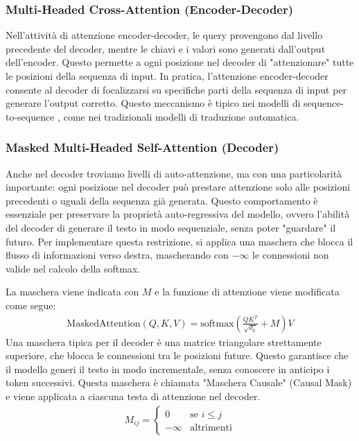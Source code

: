 \subsubsection{Multi-Headed Cross-Attention (Encoder-Decoder)}
Nell'attività di attenzione encoder-decoder, le query provengono dal livello precedente del decoder, mentre le chiavi e i valori sono generati dall'output dell'encoder. Questo permette a ogni posizione nel decoder di "attenzionare" tutte le posizioni della sequenza di input. In pratica, l'attenzione encoder-decoder consente al decoder di focalizzarsi su specifiche parti della sequenza di input per generare l'output corretto. Questo meccanismo è tipico nei modelli di sequence-to-sequence \cite{sutskever2014sequencesequencelearningneural}, come nei tradizionali modelli di traduzione automatica.

\subsubsection{Masked Multi-Headed Self-Attention (Decoder)}
\label{sec:masked-multi-head-attention}
Anche nel decoder troviamo livelli di auto-attenzione, ma con una particolarità importante: ogni posizione nel decoder può prestare attenzione solo alle posizioni precedenti o uguali della sequenza già generata. Questo comportamento è essenziale per preservare la proprietà auto-regressiva del modello, ovvero l'abilità del decoder di generare il testo in modo sequenziale, senza poter "guardare" il futuro. Per implementare questa restrizione, si applica una maschera che blocca il flusso di informazioni verso destra, mascherando con \(-\infty\)  le connessioni non valide nel calcolo della softmax.

La maschera viene indicata con \(M\) e la funzione di attenzione viene modificata come segue:
\begin{align}
	\text{MaskedAttention}(Q, K, V) = \text{softmax}\left(\frac{QK^T}{\sqrt{d_k}} + M\right)V
\end{align}
Una maschera tipica per il decoder è una matrice triangolare strettamente superiore, che blocca le connessioni tra le posizioni future. Questo garantisce che il modello generi il testo in modo incrementale, senza conoscere in anticipo i token successivi. Questa maschera è chiamata "Maschera Causale" (Causal Mask) e viene applicata a ciascuna testa di attenzione nel decoder.
\begin{align}
	M_{ij} = \begin{cases}
		0 & \text{se } i \leq j \\
		-\infty & \text{altrimenti}
	\end{cases}
\end{align}

